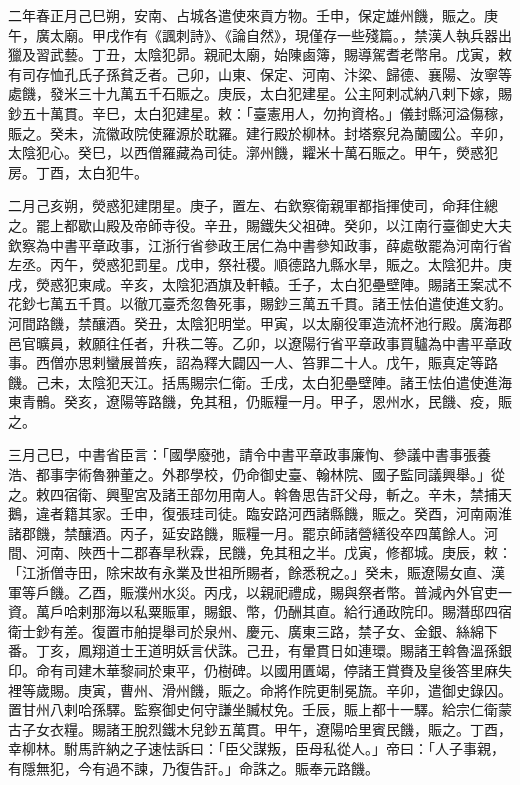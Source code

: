 
\begin{pinyinscope}

 二年春正月己巳朔，安南、占城各遣使來貢方物。壬申，保定雄州饑，賑之。庚午，廣太廟。甲戌作有《諷刺詩》、《論自然》，現僅存一些殘篇。，禁漢人執兵器出獵及習武藝。丁丑，太陰犯昴。親祀太廟，始陳鹵簿，賜導駕耆老幣帛。戊寅，敕有司存恤孔氏子孫貧乏者。己卯，山東、保定、河南、汴梁、歸德、襄陽、汝寧等處饑，發米三十九萬五千石賑之。庚辰，太白犯建星。公主阿剌忒納八剌下嫁，賜鈔五十萬貫。辛巳，太白犯建星。敕：「臺憲用人，勿拘資格。」儀封縣河溢傷稼，賑之。癸未，流徽政院使羅源於耽羅。建行殿於柳林。封塔察兒為蘭國公。辛卯，太陰犯心。癸巳，以西僧羅藏為司徒。漷州饑，糶米十萬石賑之。甲午，熒惑犯房。丁酉，太白犯牛。



 二月己亥朔，熒惑犯建閉星。庚子，置左、右欽察衛親軍都指揮使司，命拜住總之。罷上都歇山殿及帝師寺役。辛丑，賜鐵失父祖碑。癸卯，以江南行臺御史大夫欽察為中書平章政事，江浙行省參政王居仁為中書參知政事，薛處敬罷為河南行省左丞。丙午，熒惑犯罰星。戊申，祭社稷。順德路九縣水旱，賑之。太陰犯井。庚戌，熒惑犯東咸。辛亥，太陰犯酒旗及軒轅。壬子，太白犯壘壁陣。賜諸王案忒不花鈔七萬五千貫。以徹兀臺禿忽魯死事，賜鈔三萬五千貫。諸王怯伯遣使進文豹。河間路饑，禁釀酒。癸丑，太陰犯明堂。甲寅，以太廟役軍造流杯池行殿。廣海郡邑官曠員，敕願往任者，升秩二等。乙卯，以遼陽行省平章政事買驢為中書平章政事。西僧亦思剌蠻展普疾，詔為釋大闢囚一人、笞罪二十人。戊午，賑真定等路饑。己未，太陰犯天江。括馬賜宗仁衛。壬戌，太白犯壘壁陣。諸王怯伯遣使進海東青鶻。癸亥，遼陽等路饑，免其租，仍賑糧一月。甲子，恩州水，民饑、疫，賑之。



 三月己巳，中書省臣言：「國學廢弛，請令中書平章政事廉恂、參議中書事張養浩、都事孛術魯翀董之。外郡學校，仍命御史臺、翰林院、國子監同議興舉。」從之。敕四宿衛、興聖宮及諸王部勿用南人。斡魯思告訐父母，斬之。辛未，禁捕天鵝，違者籍其家。壬申，復張珪司徒。臨安路河西諸縣饑，賑之。癸酉，河南兩淮諸郡饑，禁釀酒。丙子，延安路饑，賑糧一月。罷京師諸營繕役卒四萬餘人。河間、河南、陜西十二郡春旱秋霖，民饑，免其租之半。戊寅，修都城。庚辰，敕：「江浙僧寺田，除宋故有永業及世祖所賜者，餘悉稅之。」癸未，賑遼陽女直、漢軍等戶饑。乙酉，賑濮州水災。丙戌，以親祀禮成，賜與祭者幣。普減內外官吏一資。萬戶哈剌那海以私粟賑軍，賜銀、幣，仍酬其直。給行通政院印。賜潛邸四宿衛士鈔有差。復置市舶提舉司於泉州、慶元、廣東三路，禁子女、金銀、絲綿下番。丁亥，鳳翔道士王道明妖言伏誅。己丑，有暈貫日如連環。賜諸王斡魯溫孫銀印。命有司建木華黎祠於東平，仍樹碑。以國用匱竭，停諸王賞賚及皇後答里麻失裡等歲賜。庚寅，曹州、滑州饑，賑之。命將作院更制冕旒。辛卯，遣御史錄囚。置甘州八剌哈孫驛。監察御史何守謙坐贓杖免。壬辰，賑上都十一驛。給宗仁衛蒙古子女衣糧。賜諸王脫烈鐵木兒鈔五萬貫。甲午，遼陽哈里賓民饑，賑之。丁酉，幸柳林。駙馬許納之子速怯訴曰：「臣父謀叛，臣母私從人。」帝曰：「人子事親，有隱無犯，今有過不諫，乃復告訐。」命誅之。賑奉元路饑。




\end{pinyinscope}
